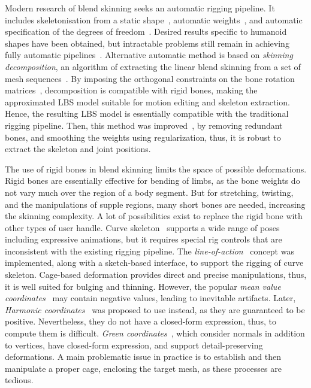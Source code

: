 Modern research of blend skinning seeks an automatic rigging pipeline. It includes skeletonisation from a static shape~\cite{Baran:2007:ARA,Shapira:2008:CMP,Jacobson:2014:TMI}, automatic weights~\cite{Baran:2007:ARA,Jacobson:2011:BBW,Dionne:2013:GVB}, and automatic specification of the degrees of freedom~\cite{Gleicher:1999:AOM,Shi:2007:MPC,Jacobson:2012:FAS}. Desired results specific to humanoid shapes have been obtained, but intractable problems still remain in achieving fully automatic pipelines~\cite{skinningcourse:2014}. Alternative automatic method is based on \textit{skinning decomposition}, an algorithm of extracting the linear blend skinning from a set of mesh sequences~\cite{James:2005:SMA,kavan:2010:SAM}.  By imposing the orthogonal constraints on the bone rotation matrices~\cite{Le:2012:SSD}, decomposition is compatible with rigid bones, making the approximated LBS model suitable for motion editing and skeleton extraction. Hence, the resulting LBS model is essentially compatible with the traditional rigging pipeline. Then, this method was improved~\cite{Le:2014:RAS}, by removing redundant bones, and smoothing the weights using regularization, thus, it is robust to extract the skeleton and joint positions.

The use of rigid bones in blend skinning limits the space of possible deformations. Rigid bones are essentially effective for bending of limbs, as the bone weights do not vary much over the region of a body segment. But for stretching, twisting, and the manipulations of supple regions, many short bones are needed, increasing the skinning complexity. A lot of possibilities exist to replace the rigid bone with other types of user handle.  Curve skeleton~\cite{Yang:2006:CSS,Forstmann:2007:DSS} supports a wide range of poses including expressive animations, but it requires special rig controls that are inconsistent with the existing rigging pipeline. The \textit{line-of-action}~\cite{Guay:2013:LAI,Oztireli:2013:DBE} concept was implemented, along with a sketch-based interface, to support the rigging of curve skeleton. Cage-based deformation provides direct and precise manipulations, thus, it is well suited for bulging and thinning. However, the popular \textit{mean value coordinates}~\cite{Ju:2005:MVC} may contain negative values, leading to inevitable artifacts. Later, \textit{Harmonic coordinates}~\cite{Joshi:2007:HCC} was proposed to use instead, as they are guaranteed to be positive.  Nevertheless, they do not have a closed-form expression, thus, to compute them is difficult. \textit{Green coordinates}~\cite{Lipman:2008:GC}, which consider normals in addition to vertices, have closed-form expression, and support detail-preserving deformations. A main problematic issue in practice is to establish and then manipulate a proper cage, enclosing the target mesh, as these processes are tedious.

